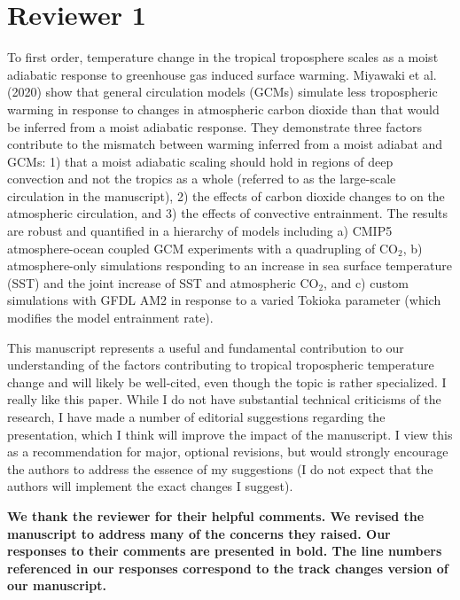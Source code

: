 \documentclass[11pt]{article}
\date{}
\title{}
\begin{document}
\section*{Reviewer 1}
\label{sec:orgc950ce6}
To first order, temperature change in the tropical troposphere scales as a moist adiabatic response to greenhouse gas induced surface warming. Miyawaki et al. (2020) show that general circulation models (GCMs) simulate less tropospheric warming in response to changes in atmospheric carbon dioxide than that would be inferred from a moist adiabatic response. They demonstrate three factors contribute to the mismatch between warming inferred from a moist adiabat and GCMs: 1) that a moist adiabatic scaling should hold in regions of deep convection and not the tropics as a whole (referred to as the large-scale circulation in the manuscript), 2) the effects of carbon dioxide changes to on the atmospheric circulation, and 3) the effects of convective entrainment. The results are robust and quantified in a hierarchy of models including a) CMIP5 atmosphere-ocean coupled GCM experiments with a quadrupling of CO\(_2\), b) atmosphere-only simulations responding to an increase in sea surface temperature (SST) and the joint increase of SST and atmospheric CO\(_2\), and c) custom simulations with GFDL AM2 in response to a varied Tokioka parameter (which modifies the model entrainment rate).

This manuscript represents a useful and fundamental contribution to our understanding of the factors contributing to tropical tropospheric temperature change and will likely be well-cited, even though the topic is rather specialized. I really like this paper. While I do not have substantial technical criticisms of the research, I have made a number of editorial suggestions regarding the presentation, which I think will improve the impact of the manuscript. I view this as a recommendation for major, optional revisions, but would strongly encourage the authors to address the essence of my suggestions (I do not expect that the authors will implement the exact changes I suggest).

\textbf{We thank the reviewer for their helpful comments. We revised the manuscript to address many of the concerns they raised. Our responses to their comments are presented in bold. The line numbers referenced in our responses correspond to the track changes version of our manuscript.}
\end{document}
